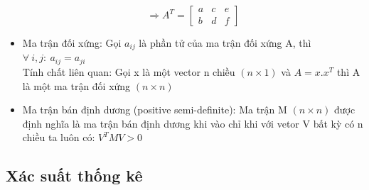 \begin{itemize}
\[\Rightarrow A^T =
\begin{bmatrix}
a & c & e\\
b & d & f
\end{bmatrix}
\]
\item Ma trận đối xứng: Gọi $a_{ij}$  là phần tử của ma trận đối xứng A, thì
$\forall\:i,j:\:a_{ij} = a_{ji}$\\
Tính chất liên quan: Gọi x là một vector n chiều $(n \times 1)$ và $A=x.x^T$
thì A là một ma trận đối xứng $(n \times n)$
\item Ma trận bán định dương (positive semi-definite): Ma trận M $(n \times n)$
được định nghĩa là ma trận bán định dương khi vào chỉ khi với vetor V bất kỳ có
n chiều ta luôn có: $V^T MV>0$
\end{itemize}
\subsection{Xác suất thống kê}

